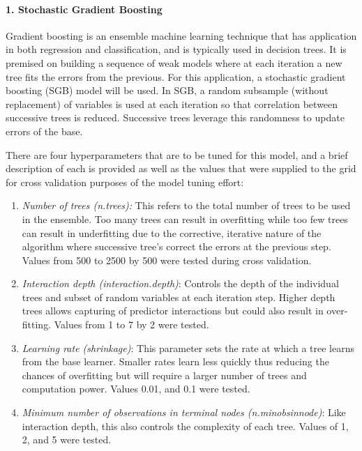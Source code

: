 \documentclass{article}
\begin{document}
\hypertarget{stochastic-gradient-boosting}{%
\paragraph{1. Stochastic Gradient
Boosting}\label{stochastic-gradient-boosting}}

Gradient boosting is an ensemble machine learning technique that has
application in both regression and classification, and is typically used
in decision trees. It is premised on building a sequence of weak models
where at each iteration a new tree fits the errors from the previous.
For this application, a stochastic gradient boosting (SGB) model will be
used. In SGB, a random subsample (without replacement) of variables is
used at each iteration so that correlation between successive trees is
reduced. Successive trees leverage this randomness to update errors of
the base.

There are four hyperparameters that are to be tuned for this model, and
a brief description of each is provided as well as the values that were
supplied to the grid for cross validation purposes of the model tuning
effort:

\begin{enumerate}
\def\labelenumi{\arabic{enumi}.}
\tightlist
\item
  \emph{Number of trees (n.trees):} This refers to the total number of
  trees to be used in the ensemble. Too many trees can result in
  overfitting while too few trees can result in underfitting due to the
  corrective, iterative nature of the algorithm where successive tree's
  correct the errors at the previous step. Values from 500 to 2500 by
  500 were tested during cross validation.
\item
  \emph{Interaction depth (interaction.depth)}: Controls the depth of
  the individual trees and subset of random variables at each iteration
  step. Higher depth trees allows capturing of predictor interactions
  but could also result in over-fitting. Values from 1 to 7 by 2 were
  tested.
\item
  \emph{Learning rate (shrinkage)}: This parameter sets the rate at
  which a tree learns from the base learner. Smaller rates learn less
  quickly thus reducing the chances of overfitting but will require a
  larger number of trees and computation power. Values 0.01, and 0.1
  were tested.
\item
  \emph{Minimum number of observations in terminal nodes
  (n.minobsinnode)}: Like interaction depth, this also controls the
  complexity of each tree. Values of 1, 2, and 5 were tested.
\end{enumerate}
\end{document}
